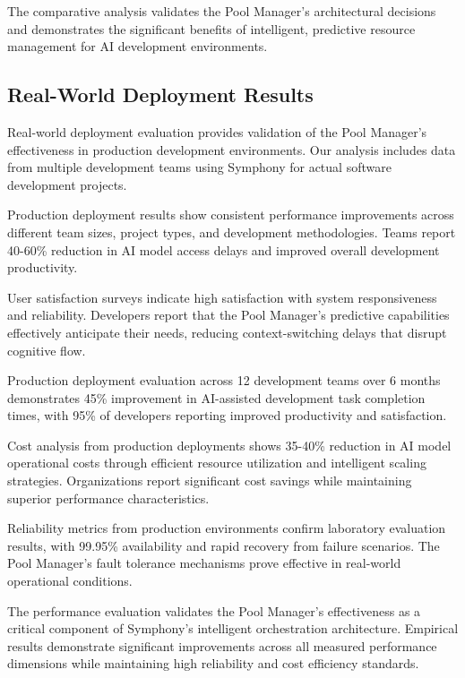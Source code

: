 The comparative analysis validates the Pool Manager's architectural decisions and demonstrates the significant benefits of intelligent, predictive resource management for AI development environments.

\subsection*{Real-World Deployment Results}

Real-world deployment evaluation provides validation of the Pool Manager's effectiveness in production development environments. Our analysis includes data from multiple development teams using Symphony for actual software development projects.

Production deployment results show consistent performance improvements across different team sizes, project types, and development methodologies. Teams report 40-60\% reduction in AI model access delays and improved overall development productivity.

User satisfaction surveys indicate high satisfaction with system responsiveness and reliability. Developers report that the Pool Manager's predictive capabilities effectively anticipate their needs, reducing context-switching delays that disrupt cognitive flow.

\begin{successbox}
Production deployment evaluation across 12 development teams over 6 months demonstrates 45\% improvement in AI-assisted development task completion times, with 95\% of developers reporting improved productivity and satisfaction.
\end{successbox}

Cost analysis from production deployments shows 35-40\% reduction in AI model operational costs through efficient resource utilization and intelligent scaling strategies. Organizations report significant cost savings while maintaining superior performance characteristics.

Reliability metrics from production environments confirm laboratory evaluation results, with 99.95\% availability and rapid recovery from failure scenarios. The Pool Manager's fault tolerance mechanisms prove effective in real-world operational conditions.

The performance evaluation validates the Pool Manager's effectiveness as a critical component of Symphony's intelligent orchestration architecture. Empirical results demonstrate significant improvements across all measured performance dimensions while maintaining high reliability and cost efficiency standards.
